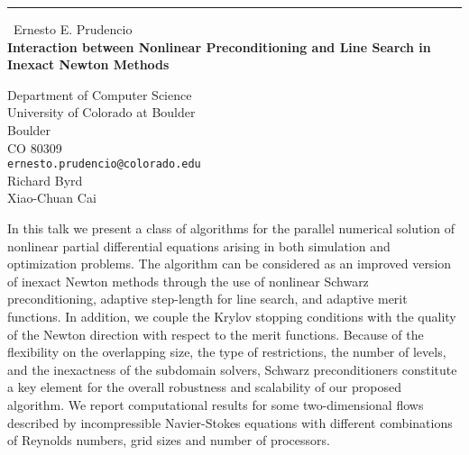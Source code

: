 \documentclass{report}
\begin{document}
\begin{center}
\rule{6in}{1pt} \
{\large Ernesto E. Prudencio \\
{\bf Interaction between Nonlinear Preconditioning and Line Search in Inexact Newton Methods}}

Department of Computer Science \\ University of Colorado at Boulder \\ Boulder \\ CO 80309
\\
{\tt ernesto.prudencio@colorado.edu}\\
Richard Byrd\\
Xiao-Chuan Cai\end{center}

In this talk we present
a class of algorithms
for the parallel numerical solution of nonlinear partial differential
equations arising in both simulation
and optimization problems.
The algorithm can be considered as an improved version of inexact Newton methods through
the use of nonlinear Schwarz preconditioning, adaptive step-length for
line search, and adaptive merit functions.
In addition,
we couple
the Krylov stopping conditions with the quality of the Newton direction
with respect to the merit functions.
Because of the flexibility on the overlapping size, the type of
restrictions, the number of levels,
and the inexactness of the subdomain solvers, Schwarz preconditioners constitute a key
element for the overall robustness and scalability of our proposed algorithm.
We report computational results for some two-dimensional flows described
by incompressible Navier-Stokes equations with
different combinations of Reynolds numbers, grid sizes and number of processors.
\end{document}
